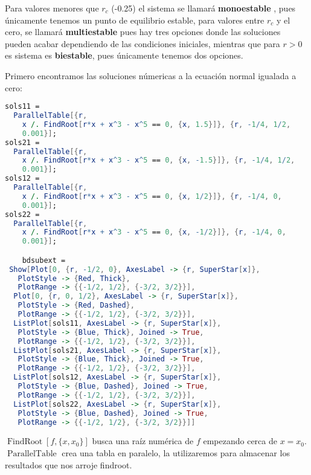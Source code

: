 Para valores menores que $r_c$ (-0.25) el sistema se llamará \textbf{monoestable} , pues únicamente tenemos un punto de equilibrio estable, para valores entre $r_c$ y el cero, se llamará  \textbf{multiestable} pues hay tres opciones donde las soluciones pueden acabar dependiendo de las condiciones iniciales, mientras que para $r>0$ es sistema es \textbf{biestable}, pues únicamente tenemos dos opciones.

  Primero encontramos las soluciones númericas a la ecuación normal igualada a cero:  
  \begin{lstlisting}[language=Mathematica, caption=Código para realizar la gráfica de la figura 3]
  sols11 = 
  ParallelTable[{r, 
    x /. FindRoot[r*x + x^3 - x^5 == 0, {x, 1.5}]}, {r, -1/4, 1/2, 
    0.001}];
sols21 = 
  ParallelTable[{r, 
    x /. FindRoot[r*x + x^3 - x^5 == 0, {x, -1.5}]}, {r, -1/4, 1/2, 
    0.001}];
sols12 = 
  ParallelTable[{r, 
    x /. FindRoot[r*x + x^3 - x^5 == 0, {x, 1/2}]}, {r, -1/4, 0, 
    0.001}];
sols22 = 
  ParallelTable[{r, 
    x /. FindRoot[r*x + x^3 - x^5 == 0, {x, -1/2}]}, {r, -1/4, 0, 
    0.001}];

    bdsubext = 
 Show[Plot[0, {r, -1/2, 0}, AxesLabel -> {r, SuperStar[x]}, 
   PlotStyle -> {Red, Thick}, 
   PlotRange -> {{-1/2, 1/2}, {-3/2, 3/2}}], 
  Plot[0, {r, 0, 1/2}, AxesLabel -> {r, SuperStar[x]}, 
   PlotStyle -> {Red, Dashed}, 
   PlotRange -> {{-1/2, 1/2}, {-3/2, 3/2}}], 
  ListPlot[sols11, AxesLabel -> {r, SuperStar[x]}, 
   PlotStyle -> {Blue, Thick}, Joined -> True, 
   PlotRange -> {{-1/2, 1/2}, {-3/2, 3/2}}], 
  ListPlot[sols21, AxesLabel -> {r, SuperStar[x]}, 
   PlotStyle -> {Blue, Thick}, Joined -> True, 
   PlotRange -> {{-1/2, 1/2}, {-3/2, 3/2}}], 
  ListPlot[sols12, AxesLabel -> {r, SuperStar[x]}, 
   PlotStyle -> {Blue, Dashed}, Joined -> True, 
   PlotRange -> {{-1/2, 1/2}, {-3/2, 3/2}}], 
  ListPlot[sols22, AxesLabel -> {r, SuperStar[x]}, 
   PlotStyle -> {Blue, Dashed}, Joined -> True, 
   PlotRange -> {{-1/2, 1/2}, {-3/2, 3/2}}]]
\end{lstlisting}

\begin{tcolorbox}[colback=Black!4,colframe=White] 
\begin{nota}
  $\operatorname{FindRoot}[f,\{x,x_0\}]$ busca una raíz numérica de $f$ empezando cerca de  $x=x_0$.
    $\operatorname{ParallelTable}$ crea una tabla en paralelo, la utilizaremos para almacenar los resultados que nos arroje findroot. 
\end{nota}
\end{tcolorbox}



